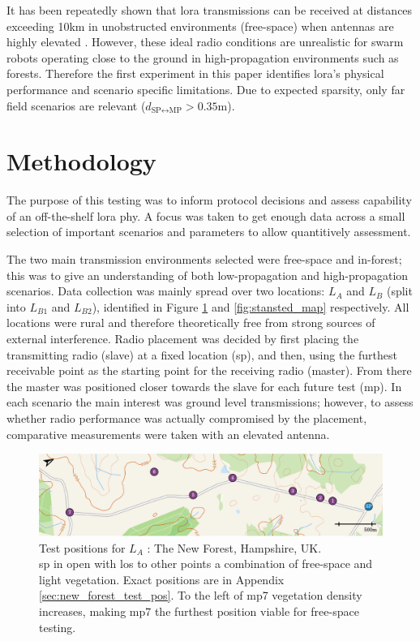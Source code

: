 It has been repeatedly shown that \ac{lora} transmissions can be received at distances exceeding 10km in  unobstructed environments (free-space) when antennas are highly elevated \cite{3YP:LORA_RANGE_REVIEW}. However, these ideal radio conditions are unrealistic for swarm robots operating close to the ground in high-propagation environments such as forests. Therefore the first experiment in this paper identifies \ac{lora}'s physical performance and scenario specific limitations. Due to expected sparsity, only far field scenarios are relevant ($d_{\text{SP}\leftrightarrow \text{MP}} >  0.35$m).


\section{Methodology}
The purpose of this testing was to inform protocol decisions and assess capability of an off-the-shelf \ac{lora} \ac{phy}. A focus was taken to get enough data across a small selection of important scenarios and parameters to allow quantitively assessment. 

 The two main transmission environments selected were free-space and in-forest; this was to give an understanding of both low-propagation and high-propagation scenarios. Data collection was mainly spread over two locations: \textbf{$L_{A}$} and \textbf{$L_{B}$} (split into \textbf{$L_{B1}$} and \textbf{$L_{B2}$}), identified in Figure \ref{fig:new_forest_map} and \ref{fig:stansted_map} respectively. All locations were rural and therefore theoretically free from strong sources of external interference. Radio placement was decided by first placing the transmitting radio (slave) at a fixed location (\ac{sp}), and then, using the furthest receivable point as the starting point for the receiving radio (master). From there the master was positioned closer towards the slave for each future test (\ac{mp}). In each scenario the main interest was ground level transmissions; however, to assess whether radio performance was actually compromised by the placement, comparative measurements were taken with an elevated antenna. 
 
  \begin{figure}[H]
    \centering
    \includegraphics[width=\textwidth]{Figures/new_forest_light}
    \caption[Test Location: The New Forest, Hampshire, UK]{
    Test positions for \textbf{$L_A$} :  The New Forest, Hampshire, UK.\protect\footnotemark[1] \\
    \ac{sp} in open with \ac{los} to other points a combination of free-space and light vegetation. Exact positions are in Appendix \ref{sec:new_forest_test_pos}. To the left of \ac{mp}7 vegetation density increases,  making \ac{mp}7 the furthest position viable for free-space testing.
    }
    \label{fig:new_forest_map}
\end{figure}

